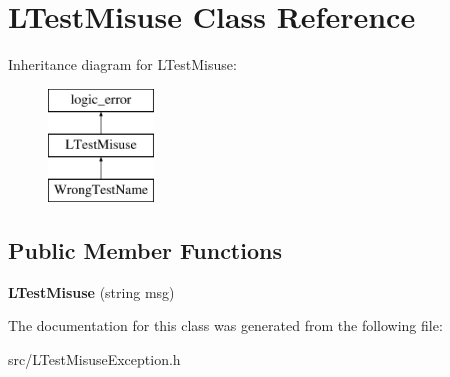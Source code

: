\hypertarget{class_l_test_misuse}{\section{L\-Test\-Misuse Class Reference}
\label{class_l_test_misuse}
}
Inheritance diagram for L\-Test\-Misuse\-:\begin{figure}[H]
\begin{center}
\leavevmode
\includegraphics[height=3.000000cm]{class_l_test_misuse}
\end{center}
\end{figure}
\subsection*{Public Member Functions}
\begin{DoxyCompactItemize}
\item 
\hypertarget{class_l_test_misuse_a965ab98cbe6c6ced841ea01f5ef042ac}{{\bfseries L\-Test\-Misuse} (string msg)}\label{class_l_test_misuse_a965ab98cbe6c6ced841ea01f5ef042ac}

\end{DoxyCompactItemize}


The documentation for this class was generated from the following file\-:\begin{DoxyCompactItemize}
\item 
src/L\-Test\-Misuse\-Exception.\-h\end{DoxyCompactItemize}
